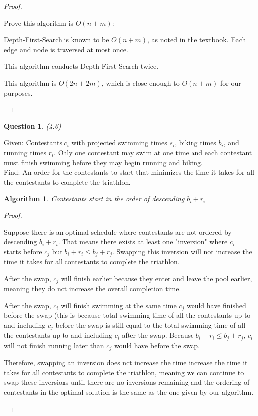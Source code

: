 \documentclass[11pt, oneside]{article}   	%
\newtheorem{Question}{Question}
\newtheorem{Algorithm}{Algorithm}
\begin{document}
\begin{proof}
\begin{description}
Prove this algorithm is $O(n+m)$:

 Depth-First-Search is known to be $O(n+m)$, as noted in the textbook. Each edge and node is traversed at most once.

This algorithm conducts Depth-First-Search twice.

This algorithm is $O(2n+2m)$, which is close enough to $O(n+m)$ for our purposes.

\end{description}
\end{proof}

\newpage

\begin{Question} (4.6)
\end{Question}
\noindent Given: Contestants $c_i$ with projected swimming times $s_i$, biking times $b_i$, and running times $r_i$. Only one contestant may swim at one time and each contestant must finish swimming before they may begin running and biking.\\

\noindent Find: An order for the contestants to start that minimizes the time it takes for all the contestants to complete the triathlon. 

\begin{Algorithm}
Contestants start in the order of descending $b_i + r_i$
\end{Algorithm}

\begin{proof}
\begin{description}
Suppose there is an optimal schedule where contestants are not ordered by descending $b_i + r_i$. That means there exists at least one "inversion" where $c_i$ starts before $c_j$ but $b_i+r_i \leq b_j+r_j$. Swapping this inversion will not increase the time it takes for all contestants to complete the triathlon.

After the swap, $c_j$ will finish earlier because they enter and leave the pool earlier, meaning they do not increase the overall completion time.

After the swap, $c_i$ will finish swimming at the same time $c_j$ would have finished before the swap (this is because total swimming time of all the contestants up to and including $c_j$ before the swap is still equal to the total swimming time of all the contestants up to and including $c_i$ after the swap. Because $b_i+r_i \leq b_j+r_j$, $c_i$ will not finish running later than $c_j$ would have before the swap.

Therefore, swapping an inversion does not increase the time increase the time it takes for all contestants to complete the triathlon, meaning we can continue to swap these inversions until there are no inversions remaining and the ordering of contestants in the optimal solution is the same as the one given by our algorithm. 
\end{description}
\end{proof}
\end{document}
